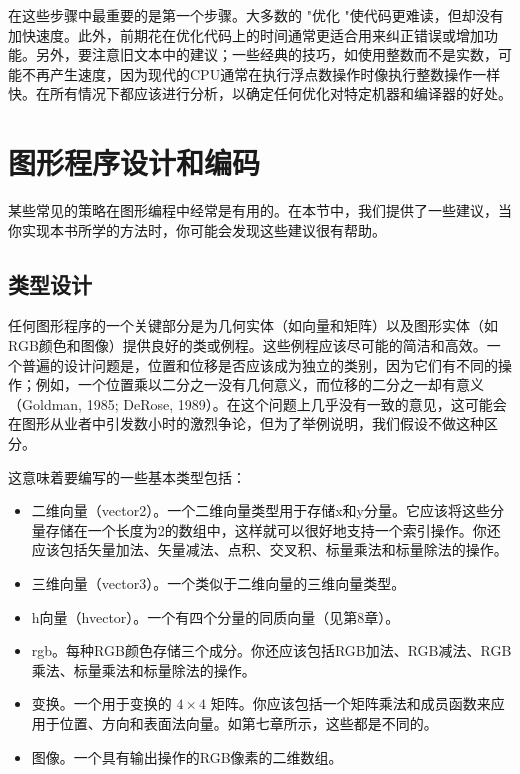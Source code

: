 \documentclass[lang=cn,12pt]{elegantbook}
\begin{document}
在这些步骤中最重要的是第一个步骤。大多数的 "优化 "使代码更难读，但却没有加快速度。此外，前期花在优化代码上的时间通常更适合用来纠正错误或增加功能。另外，要注意旧文本中的建议；一些经典的技巧，如使用整数而不是实数，可能不再产生速度，因为现代的CPU通常在执行浮点数操作时像执行整数操作一样快。在所有情况下都应该进行分析，以确定任何优化对特定机器和编译器的好处。

\section{图形程序设计和编码}

某些常见的策略在图形编程中经常是有用的。在本节中，我们提供了一些建议，当你实现本书所学的方法时，你可能会发现这些建议很有帮助。

\subsection{类型设计}

任何图形程序的一个关键部分是为几何实体（如向量和矩阵）以及图形实体（如RGB颜色和图像）提供良好的类或例程。这些例程应该尽可能的简洁和高效。一个普遍的设计问题是，位置和位移是否应该成为独立的类别，因为它们有不同的操作；例如，一个位置乘以二分之一没有几何意义，而位移的二分之一却有意义（Goldman, 1985; DeRose, 1989）。在这个问题上几乎没有一致的意见，这可能会在图形从业者中引发数小时的激烈争论，但为了举例说明，我们假设不做这种区分。



这意味着要编写的一些基本类型包括：

\begin{itemize}
  \item 二维向量（vector2）。一个二维向量类型用于存储x和y分量。它应该将这些分量存储在一个长度为2的数组中，这样就可以很好地支持一个索引操作。你还应该包括矢量加法、矢量减法、点积、交叉积、标量乘法和标量除法的操作。
  \item 三维向量（vector3）。一个类似于二维向量的三维向量类型。
  \item h向量（hvector）。一个有四个分量的同质向量（见第8章）。
  \item rgb。每种RGB颜色存储三个成分。你还应该包括RGB加法、RGB减法、RGB乘法、标量乘法和标量除法的操作。
  \item 变换。一个用于变换的 $4 \times 4$ 矩阵。你应该包括一个矩阵乘法和成员函数来应用于位置、方向和表面法向量。如第七章所示，这些都是不同的。
  \item 图像。一个具有输出操作的RGB像素的二维数组。
\end{itemize}
\end{document}
